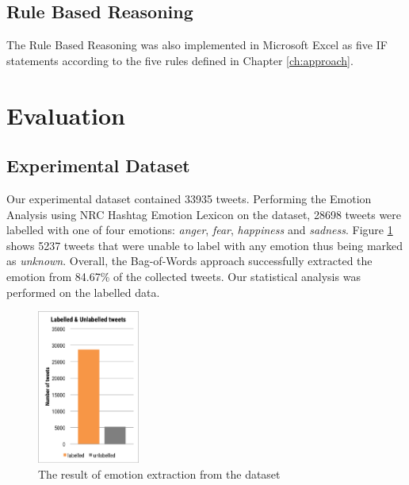 \subsection{Rule Based Reasoning}
The Rule Based Reasoning was also implemented in Microsoft Excel as five IF statements according to the five rules defined in Chapter \ref{ch:approach}.

\section{Evaluation}
\label{sec:evaluation}
\subsection{Experimental Dataset}
Our experimental dataset contained 33935 tweets. Performing the Emotion Analysis using NRC Hashtag Emotion Lexicon \citep{mohammad2014using} on the dataset, 28698 tweets were labelled with one of four emotions: \textit{anger}, \textit{fear}, \textit{happiness} and \textit{sadness}. Figure \ref{fig:emotionLabel} shows 5237 tweets that were unable to label with any emotion thus being marked as \textit{unknown}. Overall, the Bag-of-Words approach successfully extracted the emotion from 84.67\% of the collected tweets. Our statistical analysis was performed on the labelled data.

\begin{figure}[!htb]
\centering
\includegraphics[width=0.3\textwidth]{EmotionLabel}
\caption{The result of emotion extraction from the dataset}
\label{fig:emotionLabel}
\end{figure}

